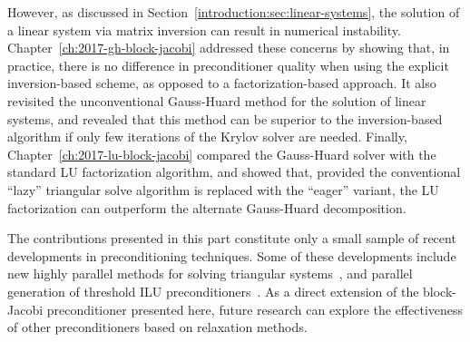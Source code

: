 However, as discussed in Section~\ref{introduction:sec:linear-systems}, the
solution of a linear system via matrix inversion can result in numerical
instability. Chapter~\ref{ch:2017-gh-block-jacobi} addressed these concerns by
showing that, in practice, there is no difference in preconditioner quality
when using the explicit inversion-based scheme, as opposed to a
factorization-based approach. It also revisited the unconventional Gauss-Huard
method for the solution of linear systems, and revealed that this method can be
superior to the inversion-based algorithm if only few iterations of the Krylov
solver are needed. Finally, Chapter~\ref{ch:2017-lu-block-jacobi} compared the
Gauss-Huard solver with the standard LU factorization algorithm, and showed
that, provided the conventional ``lazy'' triangular solve algorithm is replaced
with the ``eager'' variant, the LU factorization can outperform the alternate
Gauss-Huard decomposition.

The contributions presented in this part constitute only a small sample of
recent developments in preconditioning techniques. Some of these developments
include new highly parallel methods for solving triangular
systems~\cite{triangular-solve, isai, triangular-iterative}, and parallel
generation of threshold ILU preconditioners~\cite{ilut, ilut-gpu}. As a direct
extension of the block-Jacobi preconditioner presented here, future research can
explore the effectiveness of other preconditioners based on relaxation methods.


